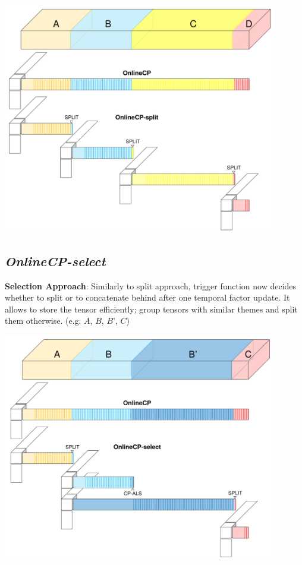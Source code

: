 \begin{center}
	\includegraphics[width=0.9\textwidth]{FIG/OnlineCP-split.png}
\end{center}

\newpage
\subsection{\em OnlineCP-select}
\textbf{Selection Approach}: Similarly to split approach, trigger function now decides whether to split or to concatenate behind after one temporal factor update. It allows to store the tensor efficiently; group tensors with similar themes and split them otherwise. (e.g. $A$, $B$, $B’$, $C$)

\begin{center}
	\includegraphics[width=0.9\textwidth]{FIG/OnlineCP-select.png}
\end{center}